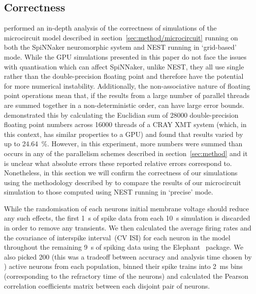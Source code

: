 \documentclass[utf8]{frontiersSCNS} %
\begin{document}
\subsection{Correctness}
\label{sec:results/correctness}
\citet{VanAlbada2018} performed an in-depth analysis of the correctness of simulations of the microcircuit model described in section~\ref{sec:method/microcircuit} running on both the SpiNNaker neuromorphic system and NEST running in `grid-based' mode.
While the GPU simulations presented in this paper do not face the issues with quantisation which can affect SpiNNaker, unlike NEST, they all use single rather than the double-precision floating point and therefore have the potential for more numerical instability.
Additionally, the non-associative nature of floating point operations mean that, if the results from a large number of parallel threads are summed together in a non-deterministic order, can have large error bounds.
\citet{Villa2009} demonstrated this by calculating the Euclidian sum of \num{28000} double-precision floating point numbers across \num{16000} threads of a CRAY XMT system (which, in this context, has similar properties to a GPU) and found that results varied by up to \SI{24.64}{\percent}.
However, in this experiment, more numbers were summed than occurs in any of the parallelism schemes described in section~\ref{sec:method} and it is unclear what absolute errors these reported relative errors correspond to.
Nonetheless, in this section we will confirm the correctness of our simulations using the methodology described by \citet{VanAlbada2018} to compare the results of our microcircuit simulation to those computed using NEST running in `precise' mode.

While the randomisation of each neurons initial membrane voltage should reduce any such effects, the first \SI{1}{\second} of spike data from each \SI{10}{\second} simulation is discarded in order to remove any transients.
We then calculated the average firing rates and the covariance of interspike interval~(CV ISI) for each neuron in the model throughout the remaining \SI{9}{\second} of spiking data using the Elephant~\citep{Yegenoglu2018} package.
We also picked \num{200} (this was a tradeoff between accuracy and analysis time chosen by \citeauthor{VanAlbada2018}) active neurons from each population, binned their spike trains into \SI{2}{\milli\second} bins (corresponding to the refractory time of the neurons) and calculated the Pearson correlation coefficients matrix between each disjoint pair of neurons.
\end{document}
